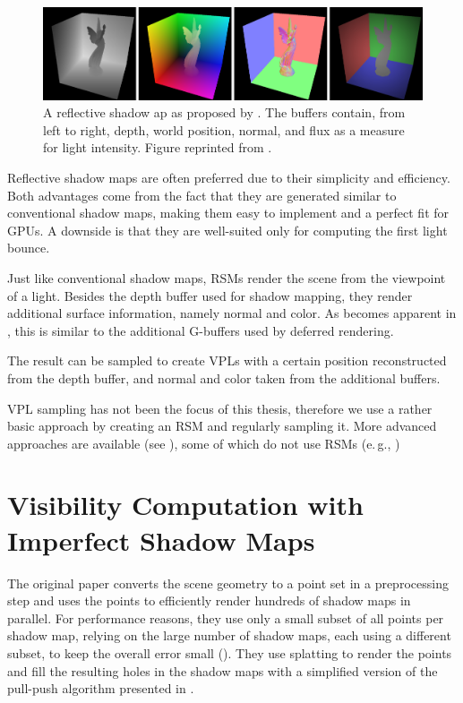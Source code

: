 \begin{figure}[htb]
\centering
    \includegraphics[width=\textwidth]{graphics/rsm_dachsbacher}
  \caption{A reflective shadow ap as proposed by \citet{Dachsbacher:2005:RSM}. The buffers contain, from left to right, depth, world position, normal, and flux as a measure for light intensity. Figure reprinted from \citet{Dachsbacher:2005:RSM}.}
  \label{fig:concept:rsm_dachsbacher}
\end{figure}

Reflective shadow maps are often preferred due to their simplicity and efficiency. Both advantages come from the fact that they are generated similar to conventional shadow maps, making them easy to implement and a perfect fit for GPUs. A downside is that they are well-suited only for computing the first light bounce.

Just like conventional shadow maps, RSMs render the scene from the viewpoint of a light. Besides the depth buffer used for shadow mapping, they render additional surface information, namely normal and color. As becomes apparent in , this is similar to the additional G-buffers used by deferred rendering.

The result can be sampled to create VPLs with a certain position reconstructed from the depth buffer, and normal and color taken from the additional buffers.

VPL sampling has not been the focus of this thesis, therefore we use a rather basic approach by creating an RSM and regularly sampling it. More advanced approaches are available (see ), some of which do not use RSMs (e.\,g., \cite{hedman2016sequential})


\section{Visibility Computation with Imperfect Shadow Maps}
\label{sec:concept:ism}

The original paper \citep{ritschel2008ism} converts the scene geometry to a point set in a preprocessing step and uses the points to efficiently render hundreds of shadow maps in parallel. For performance reasons, they use only a small subset of all points per shadow map, relying on the large number of shadow maps, each using a different subset, to keep the overall error small (). They use splatting to render the points and fill the resulting holes in the shadow maps with a simplified version of the pull-push algorithm presented in  \citep{Marroquim:2007:reconstruction}.

